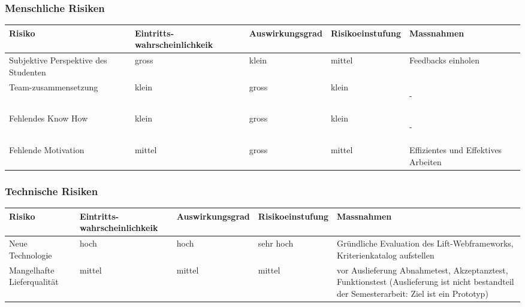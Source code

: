 \begin{landscape}
\subsubsection{Menschliche Risiken}
\begin{tabular}[ht]{|p{3cm}|p{3cm}|p{3cm}|p{3cm}|p{6cm}|}
 \hline
 Risiko & Eintritts-wahrscheinlichkeik & Auswirkungsgrad & Risikoeinstufung & Massnahmen\\
 \hline
 Subjektive Perspektive des Studenten & gross & klein & mittel & Feedbacks einholen \\
  \hline
  Team-zusammensetzung & klein & gross & klein & \begin{center}-\end{center} \\
  \hline
  Fehlendes Know How & klein & gross & klein & \begin{center}-\end{center} \\
  \hline
  Fehlende Motivation & mittel & gross & mittel & Effizientes und Effektives Arbeiten \\
  \hline
\end{tabular}

\subsubsection{Technische Risiken}
\begin{tabular}[ht]{|p{3cm}|p{3cm}|p{3cm}|p{3cm}|p{6cm}|}
  \hline
 Risiko & Eintritts-wahrscheinlichkeik & Auswirkungsgrad & Risikoeinstufung & Massnahmen\\
 \hline
 Neue Technologie & hoch & hoch & sehr hoch & Gr\"undliche Evaluation des Lift-Webframeworks, Kriterienkatalog aufstellen \\
  \hline
 Mangelhafte Lieferqualit\"at & mittel & mittel & mittel & vor Auslieferung Abnahmetest, Akzeptanztest, Funktionstest (Auslieferung ist nicht bestandteil der Semesterarbeit: Ziel ist ein Prototyp) \\
 \hline
\end{tabular}

\end{landscape}